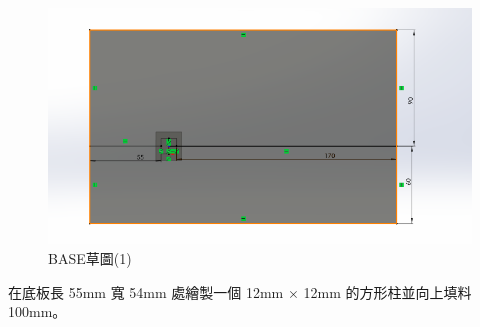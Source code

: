 \begin{figure}[htbp]
    \centering
    \includegraphics[width=1\textwidth]{./../images/6-1-27}
    \caption{BASE草圖(1)}
\end{figure}



在底板長 55mm 寬 54mm 處繪製一個 12mm $\times$ 12mm 的方形柱並向上填料 100mm。

